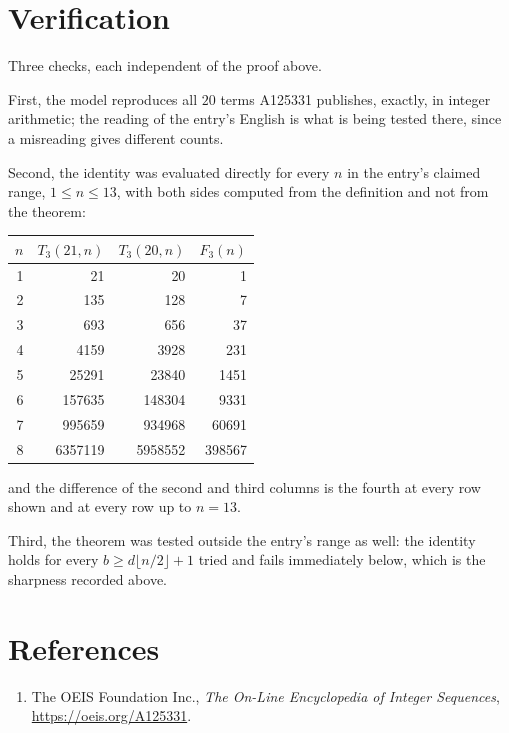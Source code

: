 \documentclass[11pt,a4paper]{article}
\theoremstyle{plain}
\theoremstyle{definition}
\begin{document}
\section{Verification}

Three checks, each independent of the proof above.

First, the model reproduces all $20$ terms A125331 publishes, exactly, in integer
arithmetic; the reading of the entry's English is what is being tested there, since a
misreading gives different counts.

Second, the identity was evaluated directly for every $n$ in the entry's claimed range,
$1\le n\le13$, with both sides computed from the definition and not from the theorem:

\begin{center}
\begin{tabular}{rrrr}
$n$ & $T_{3}(21,n)$ & $T_{3}(20,n)$ & $F_{3}(n)$ \\ \hline
1 & 21 & 20 & 1 \\
2 & 135 & 128 & 7 \\
3 & 693 & 656 & 37 \\
4 & 4159 & 3928 & 231 \\
5 & 25291 & 23840 & 1451 \\
6 & 157635 & 148304 & 9331 \\
7 & 995659 & 934968 & 60691 \\
8 & 6357119 & 5958552 & 398567 \\
\end{tabular}
\end{center}

\noindent and the difference of the second and third columns is the fourth at every row shown
and at every row up to $n=13$.

Third, the theorem was tested outside the entry's range as well: the identity holds for every
$b\ge d\lfloor n/2\rfloor+1$ tried and fails immediately below, which is the sharpness recorded
above.

\section*{References}
\begin{enumerate}
\item The OEIS Foundation Inc., \emph{The On-Line Encyclopedia of Integer Sequences},
\url{https://oeis.org/A125331}.
\end{enumerate}
\end{document}
